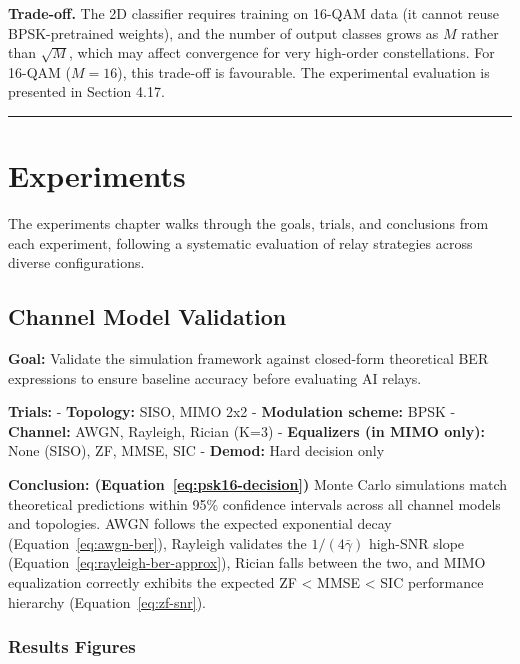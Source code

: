 \documentclass[
  english,
  12pt,
  12pt,
  a4paper,
  oneside]{report}
\begin{document}
\textbf{Trade-off.} The 2D classifier requires training on 16-QAM data (it cannot reuse BPSK-pretrained weights), and the number of output classes grows as \(M\) rather than \(\sqrt{M}\), which may affect convergence for very high-order constellations. For 16-QAM (\(M = 16\)), this trade-off is favourable. The experimental evaluation is presented in Section 4.17.

\begin{center}\rule{0.5\linewidth}{0.5pt}\end{center}

\chapter{Experiments}\label{sec:experiments}

The experiments chapter walks through the goals, trials, and conclusions from each experiment, following a systematic evaluation of relay strategies across diverse configurations.

\section{Channel Model Validation}\label{sec:channel-model-validation}

\textbf{Goal:} Validate the simulation framework against closed-form theoretical BER expressions to ensure baseline accuracy before evaluating AI relays.

\textbf{Trials:} - \textbf{Topology:} SISO, MIMO 2x2 - \textbf{Modulation scheme:} BPSK - \textbf{Channel:} AWGN, Rayleigh, Rician (K=3) - \textbf{Equalizers (in MIMO only):} None (SISO), ZF, MMSE, SIC - \textbf{Demod:} Hard decision only

\textbf{Conclusion: (Equation~\ref{eq:psk16-decision})} Monte Carlo simulations match theoretical predictions within 95\% confidence intervals across all channel models and topologies. AWGN follows the expected exponential decay (Equation~\ref{eq:awgn-ber}), Rayleigh validates the \(1/(4\bar{\gamma})\) high-SNR slope (Equation~\ref{eq:rayleigh-ber-approx}), Rician falls between the two, and MIMO equalization correctly exhibits the expected ZF \textless{} MMSE \textless{} SIC performance hierarchy (Equation~\ref{eq:zf-snr}).

\subsection{Results Figures}\label{sec:results-figures}
\end{document}
